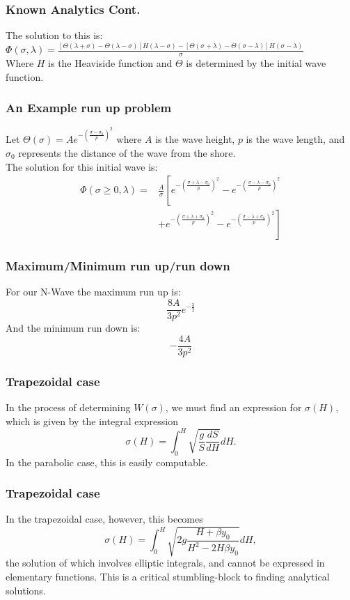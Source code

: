 \begin{frame}
\frametitle{Known Analytics Cont.}
The solution to this is:\\\vspace{7mm}
$\Phi(\sigma,\lambda)=\frac{[\Theta(\lambda+\sigma)-\Theta(\lambda-\sigma)]H(\lambda-\sigma)-[\Theta(\sigma+\lambda)-\Theta(\sigma-\lambda)]H(\sigma-\lambda)}{\sigma}$\\\vspace{3mm}
Where $H$ is the Heaviside function and $\Theta$ is determined by the initial wave function.
\end{frame}

\begin{frame}
\frametitle{An Example run up problem}
Let $\Theta(\sigma)=A e^{-(\frac{\sigma-\sigma_0}{p})^2}$ where $A$ is the wave height, $p$ is the wave length, and $\sigma_0$ represents the distance of the wave from the shore.\\
The solution for this initial wave is:\\
\begin{align*}
\Phi(\sigma\geq0,\lambda)=&\frac{A}{\sigma} \left[ e^{-(\frac{\sigma+\lambda-\sigma_0}{p})^2}-e^{-(\frac{\sigma-\lambda-\sigma_0}{p})^2} \right. \\
&\left. +e^{-(\frac{\sigma+\lambda+\sigma_0}{p})^2}-e^{-(\frac{\sigma-\lambda+\sigma_0}{p})^2} \right]
\end{align*}
\end{frame}

\begin{frame}
\frametitle{Maximum/Minimum run up/run down}

For our N-Wave the maximum run up is:\[
\frac{8A}{3p^2}e^{-\frac{3}{2}}
\]
And the minimum run down is:\[
-\frac{4A}{3p^2}
\]
\end{frame}

\begin{frame}
\frametitle{Trapezoidal case}
In the process of determining $W(\sigma)$, we must find an expression for $\sigma(H)$, which is given by the integral expression
\[
\sigma(H) = \int_0^H \sqrt{\frac{g}{S} \frac{dS}{dH}}dH.
\]
In the parabolic case, this is easily computable. 
\end{frame}
\begin{frame}
\frametitle{Trapezoidal case}
In the trapezoidal case, however, this becomes
\[
\sigma(H) = \int_0^H \sqrt{2g\frac{H + \beta y_0}{H^2 - 2H \beta y_0}} dH,
\]
the solution of which involves elliptic integrals, and cannot be expressed in elementary functions. This is a critical stumbling-block to finding analytical solutions.
\end{frame}

